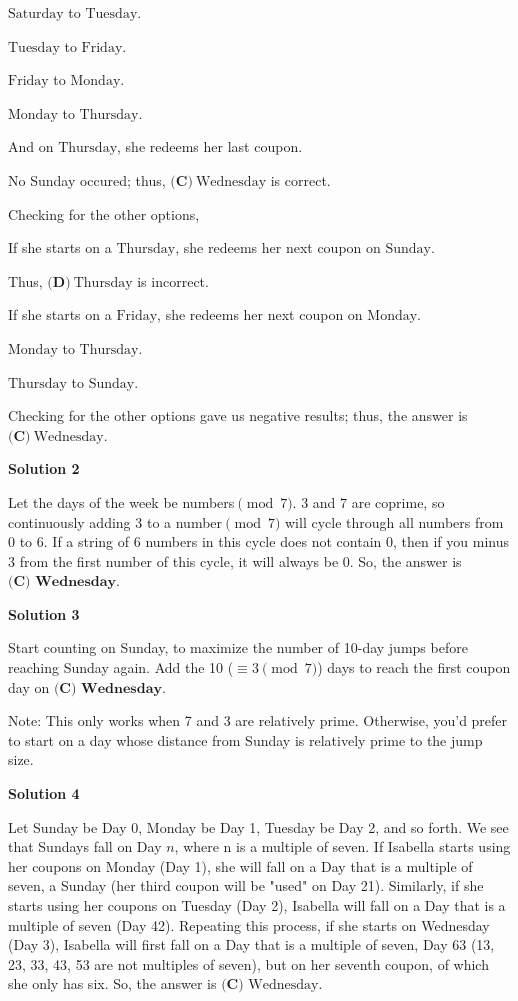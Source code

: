 \begin{enumerate}
 $\text{Saturday}$ to $\text{Tuesday}$.

 $\text{Tuesday}$ to $\text{Friday}$.

 $\text{Friday}$ to $\text{Monday}$.

 $\text{Monday}$ to $\text{Thursday}$.

 And on $\text{Thursday}$, she redeems her last coupon. 

 
No Sunday occured; thus, $\boxed{\textbf{(C)}\ \text{Wednesday}}$ is correct. 

 
Checking for the other options, 

 
If she starts on a $\text{Thursday}$, she redeems her next coupon on $\text{Sunday}$.

 Thus, $\textbf{(D)}\ \text{Thursday}$ is incorrect.

 
If she starts on a $\text{Friday}$, she redeems her next coupon on $\text{Monday}$.

 $\text{Monday}$ to $\text{Thursday}$.

 $\text{Thursday}$ to $\text{Sunday}$.

 
Checking for the other options gave us negative results; thus, the answer is $\boxed{\textbf{(C)}\ \text{Wednesday}}$.

 



\textbf{Solution 2}

Let the days of the week be numbers$\pmod 7$. $3$ and $7$ are coprime, so continuously adding $3$ to a number$\pmod 7$ will cycle through all numbers from $0$ to $6$. If a string of 6 numbers in this cycle does not contain $0$, then if you minus 3 from the first number of this cycle, it will always be $0$. So, the answer is $\boxed{\textbf{(C) Wednesday}}$.

 



\textbf{Solution 3}

Start counting on Sunday, to maximize the number of 10-day jumps before reaching Sunday again. Add the 10 ($\equiv 3 \pmod 7$) days to reach the first coupon day on $\boxed{\textbf{(C)\ Wednesday}}$.

 Note: This only works when 7 and 3 are relatively prime. Otherwise, you’d prefer to start on a day whose distance from Sunday is relatively prime to the jump size.

 



\textbf{Solution 4}

Let Sunday be Day 0, Monday be Day 1, Tuesday be Day 2, and so forth. We see that Sundays fall on Day $n$, where n is a multiple of seven. If Isabella starts using her coupons on Monday (Day 1), she will fall on a Day that is a multiple of seven, a Sunday (her third coupon will be "used" on Day 21). Similarly, if she starts using her coupons on Tuesday (Day 2), Isabella will fall on a Day that is a multiple of seven (Day 42). Repeating this process, if she starts on Wednesday (Day 3), Isabella will first fall on a Day that is a multiple of seven, Day 63 (13, 23, 33, 43, 53 are not multiples of seven), but on her seventh coupon, of which she only has six. So, the answer is $\boxed{\textbf{(C)}\text{ Wednesday}}$.


\end{enumerate}
